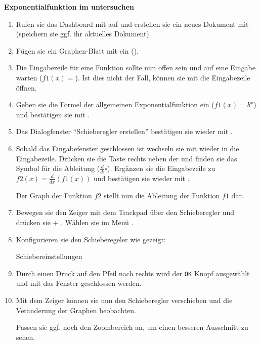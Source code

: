 \documentclass[10pt, a4paper]{scrartcl}
\begin{document}
	\newpage
	\textbf{Exponentialfunktion im \TIN untersuchen}\\
		\begin{enumerate}
			\item Rufen sie das Dashboard mit \TINon* auf und erstellen sie ein neues Dokument mit  (speichern sie ggf. ihr aktuelles Dokument).
			\item Fügen sie ein Graphen-Blatt mit  ein ().
			\item Die Eingabezeile für eine Funktion sollte nun offen sein und auf eine Eingabe warten ($f1(x)=$). Ist dies nicht der Fall, können sie mit \TINtab die Eingabezeile öffnen.
			\item Geben sie die Formel der allgemeinen Exponentialfunktion ein ($f1(x) = b^x$) und bestätigen sie mit \TINenter*.
			\item Das Dialogfenster \enquote{Schieberegler erstellen} bestätigen sie wieder mit \TINenter*.
			\item Sobald das Eingabefenster geschlossen ist wechseln sie mit \TINtab wieder in die Eingabezeile. Drücken sie die Taste rechts neben der  und finden sie das Symbol für die Ableitung ($\tfrac{d}{d\square}\square$). Ergänzen sie die Eingabezeile zu $f2(x) = \tfrac{d}{dx}(f1(x))$ und bestätigen sie wieder mit \TINenter*.
			
			Der Graph der Funktion $f2$ stellt nun die Ableitung der Funktion $f1$ dar.
			\item Bewegen sie den Zeiger mit dem Trackpad über den Schieberegler und drücken sie \TINctrl + \TINmenu*. Wählen sie im Menü .
			\item Konfigurieren sie den Schieberegeler wie gezeigt:
				\begin{center}
					\begin{tinwindow}{Schiebereinstellungen} 
					\end{tinwindow}
				\end{center}
			\item Durch einen Druck auf den Pfeil nach rechts wird der \texttt{OK} Knopf ausgewählt und mit \TINenter* das Fenster geschlossen werden.
			\item Mit dem Zeiger können sie nun den Schieberegler verschieben und die Veränderung der Graphen beobachten. 
			
			Passen sie ggf. noch den Zoombereich an, um einen besseren Ausschnitt zu sehen.
		\end{enumerate}
	
\end{document}
